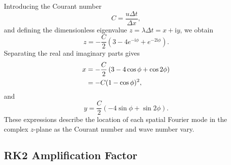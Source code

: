 Introducing the Courant number
\begin{equation}
    C=\frac{u\Delta t}{\Delta x},
    \label{eq:app-rk2-courant}
\end{equation}
and defining the dimensionless eigenvalue $z=\lambda\Delta t=x+\mathrm{i}y$, we obtain
\begin{equation}
    \boxed{
    z=-\frac{C}{2}
    \left(3-4e^{-\mathrm{i}\phi}+e^{-2\mathrm{i}\phi}\right)
    }.
    \label{eq:app-rk2-upwind-z}
\end{equation}
Separating the real and imaginary parts gives
\begin{align}
    x&=-\frac{C}{2}
    \left(3-4\cos\phi+\cos 2\phi\right) \notag\\
     &=-C(1-\cos\phi)^2,
    \label{eq:app-rk2-upwind-x}
\end{align}
and
\begin{equation}
    \boxed{
    y=\frac{C}{2}\left(-4\sin\phi+\sin 2\phi\right)
    }.
    \label{eq:app-rk2-upwind-y}
\end{equation}
These expressions describe the location of each spatial Fourier mode in the complex $z$-plane as the Courant number and wave number vary.

\subsection{RK2 Amplification Factor}
\label{app:rk2-upwind-amplification}

